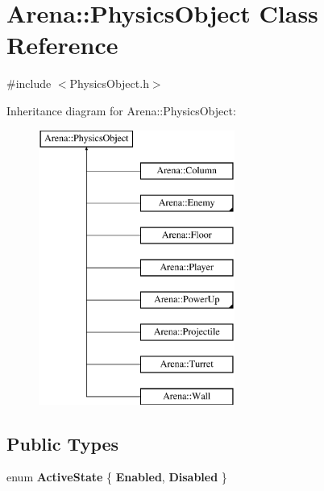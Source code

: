 \hypertarget{class_arena_1_1_physics_object}{\section{Arena\+:\+:Physics\+Object Class Reference}
\label{class_arena_1_1_physics_object}
}


{\ttfamily \#include $<$Physics\+Object.\+h$>$}

Inheritance diagram for Arena\+:\+:Physics\+Object\+:\begin{figure}[H]
\begin{center}
\leavevmode
\includegraphics[height=9.000000cm]{class_arena_1_1_physics_object}
\end{center}
\end{figure}
\subsection*{Public Types}
\begin{DoxyCompactItemize}
\item 
\hypertarget{class_arena_1_1_physics_object_a892a743368b715227ee1a0fa27493899}{enum {\bfseries Active\+State} \{ {\bfseries Enabled}, 
{\bfseries Disabled}
 \}}\label{class_arena_1_1_physics_object_a892a743368b715227ee1a0fa27493899}

\end{DoxyCompactItemize}
